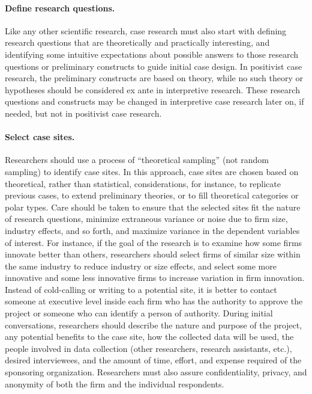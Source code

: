 \paragraph{Define research questions.} Like any other scientific research, case research must also start with defining research questions that are theoretically and practically interesting, and identifying some intuitive expectations about possible answers to those research questions or preliminary constructs to guide initial case design. In positivist case research, the preliminary constructs are based on theory, while no such theory or hypotheses should be considered ex ante in interpretive research. These research questions and constructs may be changed in interpretive case research later on, if needed, but not in positivist case research.

\paragraph{Select case sites.} Researchers should use a process of ``theoretical sampling'' (not random sampling) to identify case sites. In this approach, case sites are chosen based on theoretical, rather than statistical, considerations, for instance, to replicate previous cases, to extend preliminary theories, or to fill theoretical categories or polar types. Care should be taken to ensure that the selected sites fit the nature of research questions, minimize extraneous variance or noise due to firm size, industry effects, and so forth, and maximize variance in the dependent variables of interest. For instance, if the goal of the research is to examine how some firms innovate better than others, researchers should select firms of similar size within the same industry to reduce industry or size effects, and select some more innovative and some less innovative firms to increase variation in firm innovation. Instead of cold-calling or writing to a potential site, it is better to contact someone at executive level inside each firm who has the authority to approve the project or someone who can identify a person of authority. During initial conversations, researchers should describe the nature and purpose of the project, any potential benefits to the case site, how the collected data will be used, the people involved in data collection (other researchers, research assistants, etc.), desired interviewees, and the amount of time, effort, and expense required of the sponsoring organization. Researchers must also assure confidentiality, privacy, and anonymity of both the firm and the individual respondents.

